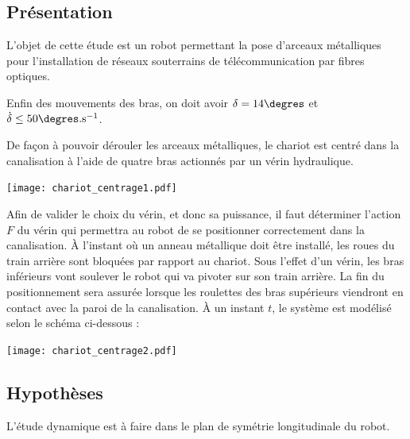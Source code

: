 \ifprof
\else
\begin{multicols}{2}
\fi

\subsection*{Présentation}
\ifprof
\else
L'objet de cette étude est un robot permettant la pose d'arceaux métalliques pour l'installation de réseaux souterrains de télécommunication par fibres optiques.
\fi
\begin{obj}
Enfin des mouvements des bras, on doit avoir $\delta=14\degres$ et $\dot{\delta}\leq 50\degres.\text{s}^{-1}$.
\end{obj}
%
\ifprof
\else

De façon à pouvoir dérouler les arceaux métalliques, le chariot est centré dans la canalisation à l'aide de quatre bras actionnés par un vérin hydraulique.

\begin{center}
\texttt{[image: chariot\_centrage1.pdf]}
\end{center}


Afin de valider le choix du vérin, et donc sa puissance, il faut déterminer l'action $F$ du vérin
qui permettra au robot de se positionner correctement dans la canalisation.
À l'instant où un anneau métallique doit
être installé, les roues du train arrière sont
bloquées par rapport au chariot. Sous l'effet
d'un vérin, les bras inférieurs vont soulever le
robot qui va pivoter sur son train arrière. La fin
du positionnement sera assurée lorsque les
roulettes des bras supérieurs viendront en
contact avec la paroi de la canalisation.
À un instant $t$, le système est modélisé selon le schéma ci-dessous :


\begin{center}
\texttt{[image: chariot\_centrage2.pdf]}
\end{center}
\fi

\subsection*{Hypothèses}
\ifprof
\else

L'étude dynamique est à faire dans le plan de symétrie longitudinale du robot.


\end{multicols}
